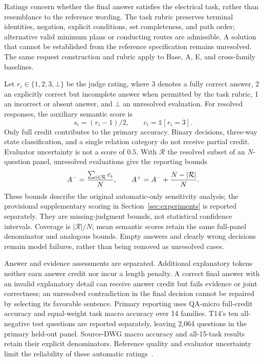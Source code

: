 Ratings concern whether the final answer satisfies the electrical task, rather than resemblance to the reference wording. The task rubric preserves terminal identities, negation, explicit conditions, set completeness, and path order; alternative valid minimum plans or conducting routes are admissible. A solution that cannot be established from the reference specification remains unresolved. The same request construction and rubric apply to Base, A, E, and cross-family baselines. 

Let $r_i\in\{1,2,3,\bot\}$ be the judge rating, where 3 denotes a fully correct answer, 2 an explicitly correct but incomplete answer when permitted by the task rubric, 1 an incorrect or absent answer, and $\bot$ an unresolved evaluation. For resolved responses, the auxiliary semantic score is
\begin{equation}
s_i=(r_i-1)/2,\qquad c_i=\mathbb{1}[r_i=3].
\label{eq:judgescore}
\end{equation}
Only full credit contributes to the primary accuracy. Binary decisions, three-way state classification, and a single relation category do not receive partial credit. Evaluator uncertainty is not a score of $0.5$. With $\mathcal R$ the resolved subset of an $N$-question panel, unresolved evaluations give the reporting bounds
\begin{equation}
 A^-={\textstyle\sum_{i\in\mathcal R}c_i\over N},\qquad
 A^+=A^-+{N-|\mathcal R|\over N}.
\label{eq:unresolvedbounds}
\end{equation}
These bounds describe the original automatic-only sensitivity analysis; the provisional supplementary scoring in Section~\ref{sec:experiments} is reported separately. They are missing-judgment bounds, not statistical confidence intervals. Coverage is $|\mathcal R|/N$; mean semantic scores retain the same full-panel denominator and analogous bounds. Empty answers and clearly wrong decisions remain model failures, rather than being removed as unresolved cases.

Answer and evidence assessments are separated. Additional explanatory tokens neither earn answer credit nor incur a length penalty. A correct final answer with an invalid explanatory detail can receive answer credit but fails evidence or joint correctness; an unresolved contradiction in the final decision cannot be repaired by selecting its favorable sentence. Primary reporting uses QA-micro full-credit accuracy and equal-weight task macro accuracy over 14 families. T14's ten all-negative test questions are reported separately, leaving 2,064 questions in the primary held-out panel. Source-DWG macro accuracy and all-15-task results retain their explicit denominators. Reference quality and evaluator uncertainty limit the reliability of these automatic ratings~\cite{zheng2023judge,zeng2024llmbar}.

